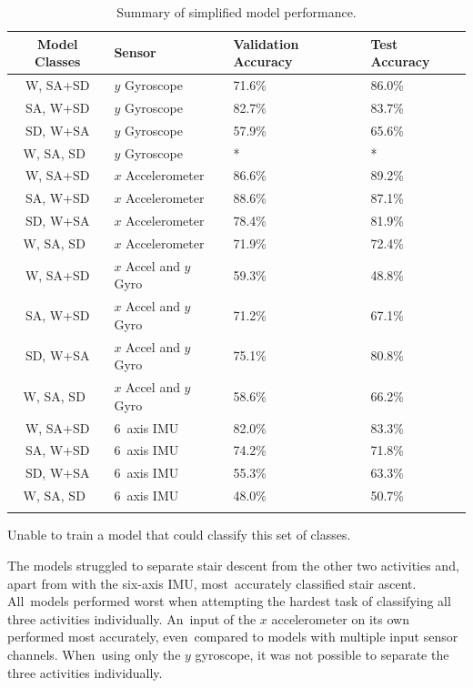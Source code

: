 \begin{table}[!hbt]
    \centering
    \caption{Summary of simplified model performance.}
    \label{tab:simplified_model_perfomances}
  
\begin{tabularx}{\textwidth}{cYYY}
        \textbf{Model Classes} & \textbf{Sensor} & \textbf{Validation Accuracy} & \textbf{Test Accuracy}\\
        \midrule
        W, SA+SD & $y$ Gyroscope & 71.6\% & 86.0\% \\
        SA, W+SD & $y$ Gyroscope & 82.7\% & 83.7\% \\
        SD, W+SA & $y$ Gyroscope & 57.9\% & 65.6\% \\
        W, SA, SD~& $y$ Gyroscope & * & * \\
        W, SA+SD & $x$ Accelerometer & 86.6\% & 89.2\% \\
        SA, W+SD & $x$ Accelerometer & 88.6\% & 87.1\% \\
        SD, W+SA & $x$ Accelerometer & 78.4\% & 81.9\% \\
        W, SA, SD~& $x$ Accelerometer & 71.9\% & 72.4\%\\
        W, SA+SD & $x$ Accel and $y$ Gyro & 59.3\% & 48.8\% \\
        SA, W+SD & $x$ Accel and $y$ Gyro & 71.2\% & 67.1\% \\
        SD, W+SA & $x$ Accel and $y$ Gyro & 75.1\% & 80.8\% \\
        W, SA, SD~& $x$ Accel and $y$ Gyro & 58.6\% & 66.2\%\\
        W, SA+SD & 6~axis IMU & 82.0\% & 83.3\% \\
        SA, W+SD & 6~axis IMU & 74.2\% & 71.8\% \\
        SD, W+SA & 6~axis IMU & 55.3\% & 63.3\% \\
        W, SA, SD~& 6~axis IMU & 48.0\% & 50.7\%\\
\\
\end{tabularx}

\footnotesize * Unable to train a model that could classify this set of classes.
       
\end{table}


The models struggled to separate stair descent from the other two activities and, apart from with the six-axis IMU, most~accurately classified stair ascent. All~models performed worst when attempting the hardest task of classifying all three activities individually. An~input of the $x$ accelerometer on its own performed most accurately, even~compared to models with multiple input sensor channels. When~using only the $y$ gyroscope, it was not possible to separate the three activities individually.

